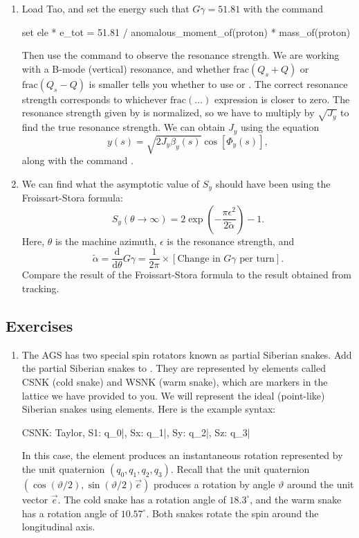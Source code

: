 \documentclass{hitec}     %
\begin{document}
{{{{\begin{enumerate}[leftmargin=*]
\item Load Tao, and set the energy such that $G\gamma=51.81$ with the command
\begin{code}
set ele * e_tot = 51.81 / anomalous_moment_of(proton) * mass_of(proton)
\end{code}
Then use the command 
to observe the resonance strength. We are working with a B-mode (vertical) resonance, and whether $\text{frac}(Q_s+Q)$ or $\text{frac}(Q_s-Q)$ is smaller tells you whether to use  or . The correct resonance strength corresponds to whichever $\text{frac}(\dots)$ expression is closer to zero. The resonance strength given by \tao is normalized, so we have to multiply by $\sqrt{J_y}$ to find the true resonance strength. We can obtain $J_y$ using the equation 
\begin{equation}
y(s)=\sqrt{2J_y\beta_y(s)}\cos[\Phi_y(s)],
\end{equation}
along with the command .

\item We can find what the asymptotic value of $S_y$ should have been using the Froissart-Stora formula:
\begin{equation}
S_y(\theta\to\infty) = 2\exp\left(-\frac{\pi\epsilon^2}{2\tilde{\alpha}}\right)-1.
\end{equation}
Here, $\theta$ is the machine azimuth, $\epsilon$ is the resonance strength, and 
\begin{equation}
\tilde{\alpha} = \frac{\mathrm{d}}{\mathrm{d}\theta}G\gamma = \frac{1}{2\pi} \times [\text{Change in }G\gamma\text{ per turn}].
\end{equation}
Compare the result of the Froissart-Stora formula to the result obtained from tracking.

\end{enumerate}

\subsection{Exercises}
\begin{enumerate}[leftmargin=*]
\item The AGS has two special spin rotators known as partial Siberian snakes. Add the partial Siberian snakes to . They are represented by elements called CSNK (cold snake) and WSNK (warm snake), which are markers in the lattice we have provided to you. We will represent the ideal (point-like) Siberian snakes using  elements. Here is the example syntax:
\begin{code}
CSNK: Taylor, {S1: q_0|}, {Sx: q_1|}, {Sy: q_2|}, {Sz: q_3|}
\end{code}
In this case, the  element produces an instantaneous rotation represented by the unit quaternion $(q_0,q_1,q_2,q_3)$. Recall that the unit quaternion $(\cos(\vartheta/2),\sin(\vartheta/2)\vec{e})$ produces a rotation by angle $\vartheta$ around the unit vector $\vec{e}$. The cold snake has a rotation angle of $18.3^\circ$, and the warm snake has a rotation angle of $10.57^\circ$. Both snakes rotate the spin around the longitudinal axis.


\end{enumerate}}}}}
\end{document}
